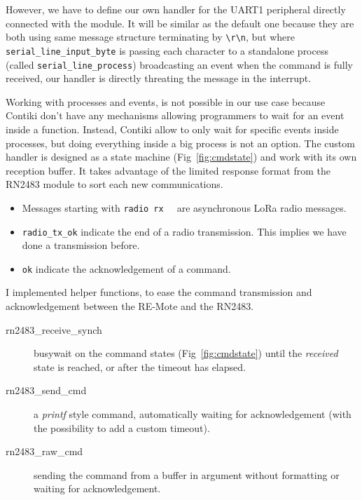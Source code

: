However, we have to define our own handler for the UART1 peripheral directly
connected with the module.
It will be similar as the default one because they are both using same message
structure terminating by \lstinline{\r\n}, but 
where \lstinline{serial_line_input_byte} is passing each character to a standalone
process (called \lstinline{serial_line_process}) broadcasting an event when the 
command is fully received, our handler is directly threating the message in the 
interrupt.

Working with processes and events, is not possible in our use case because Contiki 
don't have any mechanisms allowing programmers to wait for an event inside a 
function. Instead, Contiki allow to only wait for specific events inside
processes, but doing everything inside a big process is not an option.
The custom handler is designed as a state machine (Fig~\ref{fig:cmdstate}) and 
work with its own reception buffer. It takes advantage of the limited response 
format from the RN2483 module to sort each new communications.

\begin{itemize}
  \item Messages starting with \lstinline{radio rx  } are asynchronous LoRa
    radio messages.
  \item \lstinline{radio_tx_ok} indicate the end of a radio transmission. This
    implies we have done a transmission before.
  \item \lstinline{ok} indicate the acknowledgement of a command.
\end{itemize}


I implemented helper functions, to ease the command transmission and
acknowledgement between the RE-Mote and the RN2483.

\begin{description}
  \item[rn2483\_receive\_synch] busywait on the command states
    (Fig~\ref{fig:cmdstate}) until the \emph{received} state is 
    reached, or after the timeout has elapsed.
  \item[rn2483\_send\_cmd] a \emph{printf} style command, automatically 
    waiting for acknowledgement (with the possibility to add a custom timeout).
  \item[rn2483\_raw\_cmd] sending the command from a buffer in argument
    without formatting or waiting for acknowledgement.
\end{description}

